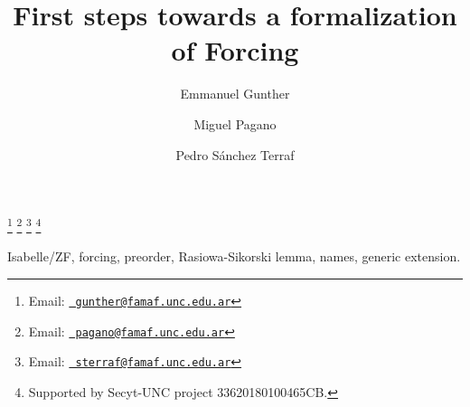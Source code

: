 \documentclass[9pt]{entcs} \usepackage{entcsmacro}
\begin{document}
\begin{frontmatter}
  \title{First steps towards a formalization of Forcing}
  \author{Emmanuel Gunther%
    }
  \address{FaMAF\\ Universidad Nacional de C\'ordoba\\
    C\'ordoba, Argentina} \author{Miguel Pagano}
  \address{FaMAF\\Universidad Nacional de C\'ordoba\\
    C\'ordoba, Argentina}
  \author{Pedro S\'anchez Terraf}
  \address{CIEM-FaMAF\\Universidad Nacional de C\'ordoba\\
    C\'ordoba, Argentina}
 \thanks[myemail]{Email:
    \href{mailto:gunther@famaf.unc.edu.ar} {\texttt{\normalshape
        gunther@famaf.unc.edu.ar}}} \thanks[coemail]{Email:
    \href{mailto:pagano@famaf.unc.edu.ar} {\texttt{\normalshape
        pagano@famaf.unc.edu.ar}}}  \thanks[co2email]{Email:
    \href{mailto:sterraf@famaf.unc.edu.ar} {\texttt{\normalshape
        sterraf@famaf.unc.edu.ar}}} 
 \thanks[ALL]{Supported by Secyt-UNC project 33620180100465CB.} 
\begin{abstract} 
\end{abstract}
\begin{keyword}
Isabelle/ZF, forcing, preorder, Rasiowa-Sikorski lemma, names, generic extension.
\end{keyword}
\end{frontmatter}

















\end{document}

